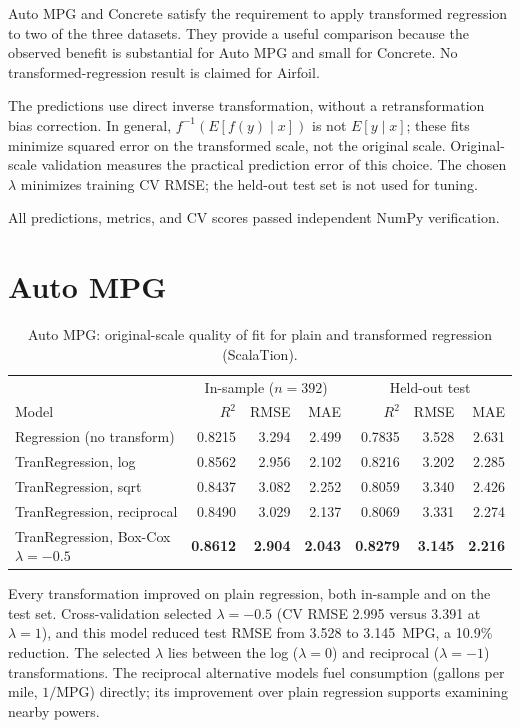 \documentclass{article}
\begin{document}
Auto MPG and Concrete satisfy the requirement to apply transformed regression to two of the three datasets. They provide a useful comparison because the observed benefit is substantial for Auto MPG and small for Concrete. No transformed-regression result is claimed for Airfoil.

The predictions use direct inverse transformation, without a retransformation bias correction. In general, $f^{-1}(E[f(y)\mid x])$ is not $E[y\mid x]$; these fits minimize squared error on the transformed scale, not the original scale. Original-scale validation measures the practical prediction error of this choice. The chosen $\lambda$ minimizes training CV RMSE; the held-out test set is not used for tuning.

All predictions, metrics, and CV scores passed independent NumPy verification.

\section{Auto MPG}

\begin{table}[H]
\centering
\small
\begin{tabular}{lrrr|rrr}
\toprule
 & \multicolumn{3}{c|}{In-sample ($n=392$)} & \multicolumn{3}{c}{Held-out test} \\
Model & $R^2$ & RMSE & MAE & $R^2$ & RMSE & MAE \\
\midrule
Regression (no transform)      & 0.8215 & 3.294 & 2.499 & 0.7835 & 3.528 & 2.631 \\
TranRegression, log            & 0.8562 & 2.956 & 2.102 & 0.8216 & 3.202 & 2.285 \\
TranRegression, sqrt           & 0.8437 & 3.082 & 2.252 & 0.8059 & 3.340 & 2.426 \\
TranRegression, reciprocal     & 0.8490 & 3.029 & 2.137 & 0.8069 & 3.331 & 2.274 \\
TranRegression, Box-Cox $\lambda=-0.5$ & \textbf{0.8612} & \textbf{2.904} & \textbf{2.043} & \textbf{0.8279} & \textbf{3.145} & \textbf{2.216} \\
\bottomrule
\end{tabular}
\caption{Auto MPG: original-scale quality of fit for plain and transformed regression (ScalaTion).}
\label{tab:tran_autompg}
\end{table}

Every transformation improved on plain regression, both in-sample and on the test set. Cross-validation selected $\lambda = -0.5$ (CV RMSE 2.995 versus 3.391 at $\lambda = 1$), and this model reduced test RMSE from 3.528 to 3.145~MPG, a 10.9\% reduction. The selected $\lambda$ lies between the log ($\lambda = 0$) and reciprocal ($\lambda = -1$) transformations. The reciprocal alternative models fuel consumption (gallons per mile, $1/\text{MPG}$) directly; its improvement over plain regression supports examining nearby powers.
\end{document}
